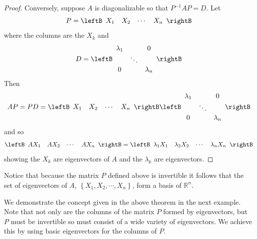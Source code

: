 \begin{proof}
Conversely, suppose $A$ is diagonalizable so that $P^{-1}AP=D.$ Let 
\begin{equation*}
P=\leftB
\begin{array}{cccc}
X_{1} & X_{2} & \cdots & X_{n}
\end{array}
\rightB 
\end{equation*}
 where the columns are the $X_{k}$ and
\begin{equation*}
D=\leftB
\begin{array}{ccc}
\lambda _{1} &  & 0 \\
& \ddots &  \\
0 &  & \lambda _{n}
\end{array}
\rightB
\end{equation*}
Then
\begin{equation*}
AP=PD=\leftB
\begin{array}{cccc}
X_{1} & X_{2} & \cdots & X_{n}
\end{array}
\rightB \leftB
\begin{array}{ccc}
\lambda _{1} &  & 0 \\
& \ddots &  \\
0 &  & \lambda _{n}
\end{array}
\rightB
\end{equation*}
and so
\begin{equation*}
\leftB
\begin{array}{cccc}
AX_{1} & AX_{2} & \cdots & AX_{n}
\end{array}
\rightB =\leftB
\begin{array}{cccc}
\lambda _{1}X_{1} & \lambda _{2}X_{2} & \cdots & \lambda
_{n}X_{n}
\end{array}
\rightB
\end{equation*}
showing the $X_{k}$ are eigenvectors of $A$ and the $\lambda _{k}$
are eigenvectors.
\end{proof}

Notice that because the matrix $P$ defined above is invertible it follows that the set of eigenvectors of $A$, $\left\{ X_1, X_2, \cdots, X_n \right\}$, form a basis of $\mathbb{R}^n$. 

We demonstrate the concept given in the above theorem in the next example. Note that not only
are the columns of the matrix $P$ formed by eigenvectors, but $P$ must
be invertible so must consist of a wide variety of eigenvectors. We
achieve this by using basic eigenvectors for the columns of $P$.

